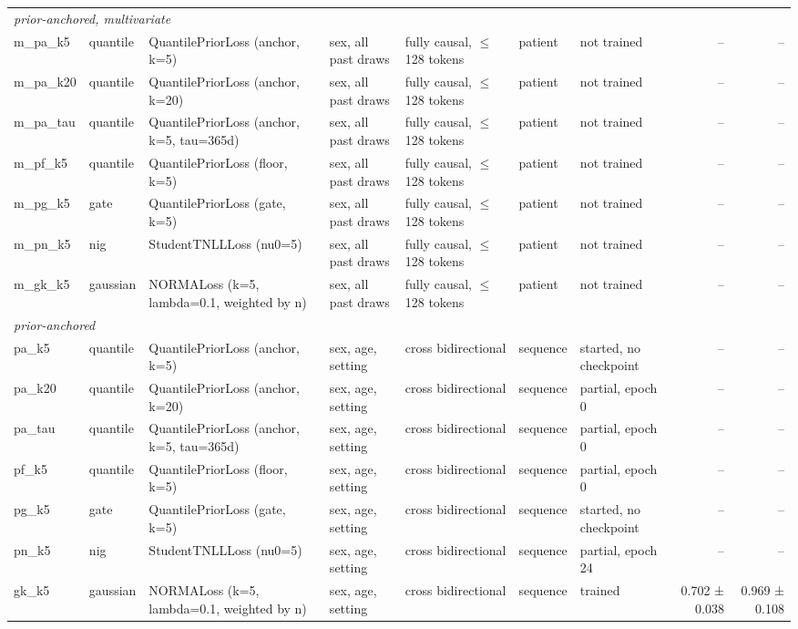 \begin{table}[ht]
\begin{tabular}{ll p{3.0cm} p{3.2cm} p{2.6cm} l p{1.9cm} rr}
\midrule
\multicolumn{9}{l}{\emph{prior-anchored, multivariate}} \\
m\_pa\_k5 & quantile & QuantilePriorLoss (anchor, k=5) & sex, all past draws & fully causal, $\leq$ 128 tokens & patient & not trained & -- & -- \\
m\_pa\_k20 & quantile & QuantilePriorLoss (anchor, k=20) & sex, all past draws & fully causal, $\leq$ 128 tokens & patient & not trained & -- & -- \\
m\_pa\_tau & quantile & QuantilePriorLoss (anchor, k=5, tau=365d) & sex, all past draws & fully causal, $\leq$ 128 tokens & patient & not trained & -- & -- \\
m\_pf\_k5 & quantile & QuantilePriorLoss (floor, k=5) & sex, all past draws & fully causal, $\leq$ 128 tokens & patient & not trained & -- & -- \\
m\_pg\_k5 & gate & QuantilePriorLoss (gate, k=5) & sex, all past draws & fully causal, $\leq$ 128 tokens & patient & not trained & -- & -- \\
m\_pn\_k5 & nig & StudentTNLLLoss (nu0=5) & sex, all past draws & fully causal, $\leq$ 128 tokens & patient & not trained & -- & -- \\
m\_gk\_k5 & gaussian & NORMALoss (k=5, lambda=0.1, weighted by n) & sex, all past draws & fully causal, $\leq$ 128 tokens & patient & not trained & -- & -- \\
\midrule
\multicolumn{9}{l}{\emph{prior-anchored}} \\
pa\_k5 & quantile & QuantilePriorLoss (anchor, k=5) & sex, age, setting & cross bidirectional & sequence & started, no checkpoint & -- & -- \\
pa\_k20 & quantile & QuantilePriorLoss (anchor, k=20) & sex, age, setting & cross bidirectional & sequence & partial, epoch 0 & -- & -- \\
pa\_tau & quantile & QuantilePriorLoss (anchor, k=5, tau=365d) & sex, age, setting & cross bidirectional & sequence & partial, epoch 0 & -- & -- \\
pf\_k5 & quantile & QuantilePriorLoss (floor, k=5) & sex, age, setting & cross bidirectional & sequence & partial, epoch 0 & -- & -- \\
pg\_k5 & gate & QuantilePriorLoss (gate, k=5) & sex, age, setting & cross bidirectional & sequence & started, no checkpoint & -- & -- \\
pn\_k5 & nig & StudentTNLLLoss (nu0=5) & sex, age, setting & cross bidirectional & sequence & partial, epoch 24 & -- & -- \\
gk\_k5 & gaussian & NORMALoss (k=5, lambda=0.1, weighted by n) & sex, age, setting & cross bidirectional & sequence & trained & 0.702 ± 0.038 & 0.969 ± 0.108 \\

\end{tabular}
\end{table}
